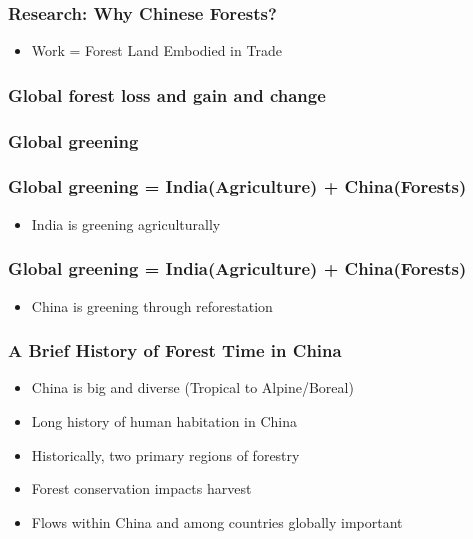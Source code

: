 \documentclass[aspectratio=169]{beamer}
\begin{document}
\begin{frame}
  \frametitle{Research: Why Chinese Forests?}

  \begin{itemize}
\item Work = Forest Land Embodied in Trade
  \end{itemize}

\end{frame}

\begin{frame}
  \frametitle{Global forest loss and gain and change}



\end{frame}

\begin{frame}
  \frametitle{Global greening}



\end{frame}

\begin{frame}
  \frametitle{Global greening = India(Agriculture) + China(Forests)}

  \begin{itemize}
  \item India is greening agriculturally
  \end{itemize}

\end{frame}

\begin{frame}
  \frametitle{Global greening = India(Agriculture) + China(Forests)}

  \begin{itemize}
  \item China is greening through reforestation 
  \end{itemize}

\end{frame}

\begin{frame}
  \frametitle{A Brief History of Forest Time in China}

  \begin{itemize}
  \item China is big and diverse (Tropical to Alpine/Boreal)
  \item Long history of human habitation in China
  \item Historically, two primary regions of forestry
  \item Forest conservation impacts harvest
  \item Flows within China and among countries globally important
  \end{itemize}

\end{frame}
\end{document}
